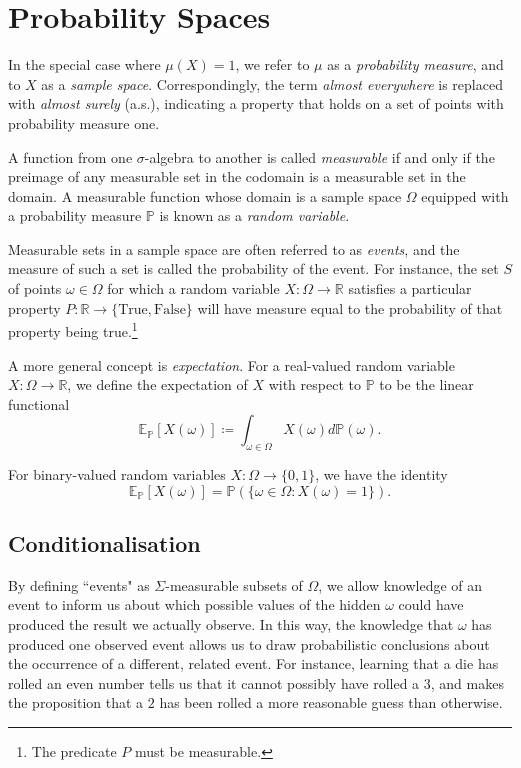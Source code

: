 \documentclass[honours,12pt]{unswthesis}
\numberwithin{equation}{section}
\begin{document}
\section{Probability Spaces}
In the special case where $\mu(X)=1$, we refer to $\mu$ as a \textit{probability measure}, and to $X$ as a \textit{sample space}. Correspondingly, the term \textit{almost everywhere} is replaced with \textit{almost surely} (a.s.), indicating a property that holds on a set of points with probability measure one.

A function from one $\sigma$-algebra to another is called \textit{measurable} if and only if the preimage of any measurable set in the codomain is a measurable set in the domain. A measurable function whose domain is a sample space $\Omega$ equipped with a probability measure $\mathbb{P}$ is known as a \textit{random variable}.

Measurable sets in a sample space are often referred to as \textit{events}, and the measure of such a set is called the probability of the event. For instance, the set $S$ of points $\omega\in\Omega$ for which a random variable $X:\Omega\to\mathbb{R}$ satisfies a particular property $P:\mathbb{R}\to\{\mathrm{True},\mathrm{False}\}$ will have measure equal to the probability of that property being true.\footnote{The predicate $P$ must be measurable.}

A more general concept is \textit{expectation}. For a real-valued random variable $X:\Omega\to \mathbb{R}$, we define the expectation of $X$ with respect to $\mathbb{P}$ to be the linear functional
$$\mathbb{E}_{\mathbb{P}}[X(\omega)] \coloneq \int_{\omega\in\Omega} X(\omega)d\mathbb{P}(\omega).$$

For binary-valued random variables $X:\Omega\to\{0,1\}$, we have the identity
$$\mathbb{E}_\mathbb{P}[X(\omega)] = \mathbb{P}\left(\{\omega\in\Omega : X(\omega)=1\}\right).$$

\subsection{Conditionalisation}
By defining ``events" as $\Sigma$-measurable subsets of $\Omega$, we allow knowledge of an event to inform us about which possible values of the hidden $\omega$ could have produced the result we actually observe. In this way, the knowledge that $\omega$ has produced one observed event allows us to draw probabilistic conclusions about the occurrence of a different, related event. For instance, learning that a die has rolled an even number tells us that it cannot possibly have rolled a $3$, and makes the proposition that a $2$ has been rolled a more reasonable guess than otherwise.
\end{document}
